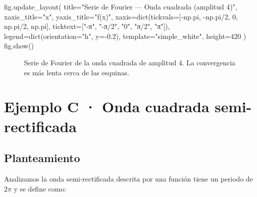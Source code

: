 \documentclass[
  letterpaper,
  DIV=11,
  numbers=noendperiod]{scrreprt}
\newenvironment{Shaded}{\begin{snugshade}}{\end{snugshade}}
\newcommand{\BuiltInTok}[1]{\textcolor[rgb]{0.00,0.23,0.31}{#1}}
\newcommand{\DecValTok}[1]{\textcolor[rgb]{0.68,0.00,0.00}{#1}}
\newcommand{\FloatTok}[1]{\textcolor[rgb]{0.68,0.00,0.00}{#1}}
\newcommand{\NormalTok}[1]{\textcolor[rgb]{0.00,0.23,0.31}{#1}}
\newcommand{\OperatorTok}[1]{\textcolor[rgb]{0.37,0.37,0.37}{#1}}
\newcommand{\StringTok}[1]{\textcolor[rgb]{0.13,0.47,0.30}{#1}}
\begin{document}
\begin{Shaded}
\begin{Highlighting}[]
\NormalTok{fig.update\_layout(}
\NormalTok{    title}\OperatorTok{=}\StringTok{"Serie de Fourier — Onda cuadrada (amplitud 4)"}\NormalTok{,}
\NormalTok{    xaxis\_title}\OperatorTok{=}\StringTok{"x"}\NormalTok{,}
\NormalTok{    yaxis\_title}\OperatorTok{=}\StringTok{"f(x)"}\NormalTok{,}
\NormalTok{    xaxis}\OperatorTok{=}\BuiltInTok{dict}\NormalTok{(tickvals}\OperatorTok{=}\NormalTok{[}\OperatorTok{{-}}\NormalTok{np.pi, }\OperatorTok{{-}}\NormalTok{np.pi}\OperatorTok{/}\DecValTok{2}\NormalTok{, }\DecValTok{0}\NormalTok{, np.pi}\OperatorTok{/}\DecValTok{2}\NormalTok{, np.pi],}
\NormalTok{               ticktext}\OperatorTok{=}\NormalTok{[}\StringTok{"{-}π"}\NormalTok{, }\StringTok{"{-}π/2"}\NormalTok{, }\StringTok{"0"}\NormalTok{, }\StringTok{"π/2"}\NormalTok{, }\StringTok{"π"}\NormalTok{]),}
\NormalTok{    legend}\OperatorTok{=}\BuiltInTok{dict}\NormalTok{(orientation}\OperatorTok{=}\StringTok{"h"}\NormalTok{, y}\OperatorTok{={-}}\FloatTok{0.2}\NormalTok{),}
\NormalTok{    template}\OperatorTok{=}\StringTok{"simple\_white"}\NormalTok{,}
\NormalTok{    height}\OperatorTok{=}\DecValTok{420}
\NormalTok{)}
\NormalTok{fig.show()}
\end{Highlighting}
\end{Shaded}

\begin{figure}


\caption{\label{fig-ej-b}Serie de Fourier de la onda cuadrada de
amplitud 4. La convergencia es más lenta cerca de las esquinas.}

\end{figure}%

\section{Ejemplo C · Onda cuadrada semi-rectificada}\label{sec-ej-c}

\subsection{Planteamiento}\label{planteamiento-6}

Analizamos la onda semi-rectificada descrita por una función tiene un
periodo de \(2\pi\) y se define como:
\end{document}
